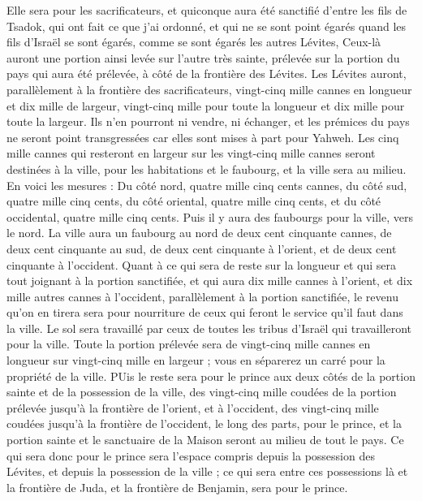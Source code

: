 \begin{multicols}{2}
Elle sera pour les sacrificateurs, et quiconque aura été sanctifié d'entre les fils de Tsadok, qui ont fait ce que j'ai ordonné, et qui ne se sont point égarés quand les fils d'Israël se sont égarés, comme se sont égarés les autres Lévites,
Ceux-là auront une portion ainsi levée sur l'autre très sainte, prélevée sur la portion du pays qui aura été prélevée, à côté de la frontière des Lévites.
Les Lévites auront, parallèlement à la frontière des sacrificateurs, vingt-cinq mille cannes en longueur et dix mille de largeur, vingt-cinq mille pour toute la longueur et dix mille pour toute la largeur.
Ils n'en pourront ni vendre, ni échanger, et les prémices du pays ne seront point transgressées car elles sont mises à part pour Yahweh.
Les cinq mille cannes qui resteront en largeur sur les vingt-cinq mille cannes seront destinées à la ville, pour les habitations et le faubourg, et la ville sera au milieu.
En voici les mesures : Du côté nord, quatre mille cinq cents cannes, du côté sud, quatre mille cinq cents, du côté oriental, quatre mille cinq cents, et du côté occidental, quatre mille cinq cents.
Puis il y aura des faubourgs pour la ville, vers le nord. La ville aura un faubourg au nord de deux cent cinquante cannes, de deux cent cinquante au sud, de deux cent cinquante à l'orient, et de deux cent cinquante à l'occident.
Quant à ce qui sera de reste sur la longueur et qui sera tout joignant à la portion sanctifiée, et qui aura dix mille cannes à l'orient, et dix mille autres cannes à l'occident, parallèlement à la portion sanctifiée, le revenu qu'on en tirera sera pour nourriture de ceux qui feront le service qu'il faut dans la ville.
Le sol sera travaillé par ceux de toutes les tribus d'Israël qui travailleront pour la ville.
Toute la portion prélevée sera de vingt-cinq mille cannes en longueur sur vingt-cinq mille en largeur ; vous en séparerez un carré pour la propriété de la ville.
PUis le reste sera pour le prince aux deux côtés de la portion sainte et de la possession de la ville, des vingt-cinq mille coudées de la portion prélevée jusqu'à la frontière de l'orient, et à l'occident, des vingt-cinq mille coudées jusqu'à la frontière de l'occident, le long des parts, pour le prince, et la portion sainte et le sanctuaire de la Maison seront au milieu de tout le pays. 
Ce qui sera donc pour le prince sera l'espace compris depuis la possession des Lévites, et depuis la possession de la ville ; ce qui sera entre ces possessions là et la frontière de Juda, et la frontière de Benjamin, sera pour le prince.

\end{multicols}

